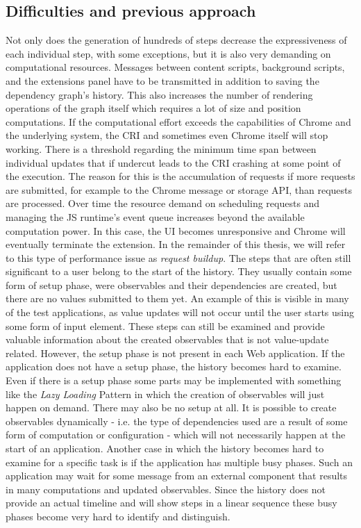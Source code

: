 \subsection{Difficulties and previous approach}
Not only does the generation of hundreds of steps decrease the expressiveness of each individual step, with some exceptions, but it is also very demanding on computational resources. Messages between content scripts, background scripts, and the extensions panel have to be transmitted in addition to saving the dependency graph's history. This also increases the number of rendering operations of the graph itself which requires a lot of size and position computations. If the computational effort exceeds the capabilities of Chrome and the underlying system, the CRI and sometimes even Chrome itself will stop working. There is a threshold regarding the minimum time span between individual updates that if undercut leads to the CRI crashing at some point of the execution. The reason for this is the accumulation of requests if more requests are submitted, for example to the Chrome message or storage API, than requests are processed. Over time the resource demand on scheduling requests and managing the JS runtime's event queue increases beyond the available computation power. In this case, the UI becomes unresponsive and Chrome will eventually terminate the extension. In the remainder of this thesis, we will refer to this type of performance issue as \emph{request buildup}.
The steps that are often still significant to a user belong to the start of the history. They usually contain some form of setup phase, were observables and their dependencies are created, but there are no values submitted to them yet. An example of this is visible in many of the test applications, as value updates will not occur until the user starts using some form of input element. These steps can still be examined and provide valuable information about the created observables that is not value-update related. However, the setup phase is not present in each Web application. If the application does not have a setup phase, the history becomes hard to examine. Even if there is a setup phase some parts may be implemented with something like the \emph{Lazy Loading} Pattern \cite{Lazy} in which the creation of observables will just happen on demand. There may also be no setup at all. It is possible to create observables dynamically - i.e. the type of dependencies used are a result of some form of computation or configuration - which will not necessarily happen at the start of an application. Another case in which the history becomes hard to examine for a specific task is if the application has multiple busy phases. Such an application may wait for some message from an external component that results in many computations and updated observables. Since the history does not provide an actual timeline and will show steps in a linear sequence these busy phases become very hard to identify and distinguish. 
